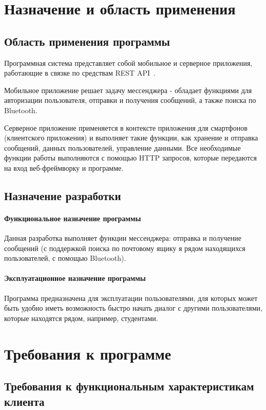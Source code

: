 \documentclass[explnote]{espd}
\begin{document}
\section{Назначение и область применения}
\subsection{Область применения программы}
Программная система представляет собой мобильное и серверное приложения, работающие в связке по средствам REST API~\cite{rest}.

Мобильное приложение решает задачу мессенджера - обладает функциями для авторизации пользователя, отправки и получения сообщений, а также поиска по Bluetooth.

Серверное приложение применяется в контексте приложения для смартфонов (клиентского приложения) и выполняет такие функции, как хранение и отправка сообщений, данных пользователей, управление данными. Все необходимые функции работы выполняются с помощью HTTP запросов, которые передаются на вход веб-фреймворку и программе.

\subsection{Назначение разработки}
\paragraph{Функциональное назначение программы}
Данная разработка выполняет функции мессенджера: отправка и получение сообщений (с поддержкой поиска по почтовому ящику я рядом находящихся пользователей, с помощью Bluetooth). 

\paragraph{Эксплуатационное назначение программы}
Программа предназначена для эксплуатации пользователями,  для которых может быть удобно иметь возможность быстро начать диалог с другими пользователями, которые находятся рядом, например, студентами.

\section{Требования к программе}
\subsection{Требования к функциональным характеристикам клиента}
\end{document}
